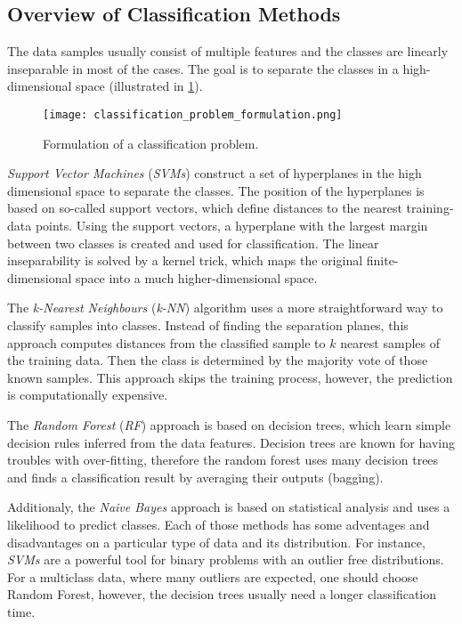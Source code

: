 \subsection*{Overview of Classification Methods} \label{ssec:other_classification_methods}
The data samples usually consist of multiple features and the classes are linearly inseparable in most of the cases. The goal is to separate the classes in a high-dimensional space (illustrated in \cref{img:classification_problem_formulation}).

\begin{figure}[H]
  \centering
  \texttt{[image: classification\_problem\_formulation.png]}
  \caption{Formulation of a classification problem.}
  \label{img:classification_problem_formulation}
\end{figure}

\textit{Support Vector Machines} (\textit{SVMs}) construct a set of hyperplanes in the high dimensional space to separate the classes. The position of the hyperplanes is based on so-called support vectors, which define distances to the nearest training-data points. Using the support vectors, a hyperplane with the largest margin between two classes is created and used for classification. The linear inseparability is solved by a kernel trick, which maps the original finite-dimensional space into a much higher-dimensional space.

The \textit{k-Nearest Neighbours} (\textit{k-NN}) algorithm uses a more straightforward way to classify samples into classes. Instead of finding the separation planes, this approach computes distances from the classified sample to $ k $ nearest samples of the training data. Then the class is determined by the majority vote of those known samples. This approach skips the training process, however, the prediction is computationally expensive.

The \textit{Random Forest} (\textit{RF}) approach is based on decision trees, which learn simple decision rules inferred from the data features. Decision trees are known for having troubles with over-fitting, therefore the random forest uses many decision trees and finds a classification result by averaging their outputs (bagging).

Additionaly, the \textit{Naive Bayes} approach is based on statistical analysis and uses a likelihood to predict classes. Each of those methods has some adventages and disadvantages on a particular type of data and its distribution. For instance, \textit{SVMs} are a powerful tool for binary problems with an outlier free distributions. For a multiclass data, where many outliers are expected, one should choose Random Forest, however, the decision trees usually need a longer classification time.

